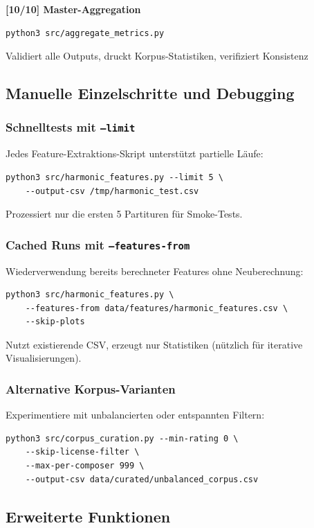 \documentclass[12pt,a4paper]{article}
\theoremstyle{definition}
\begin{document}
\textbf{[10/10] Master-Aggregation}
\begin{lstlisting}
python3 src/aggregate_metrics.py
\end{lstlisting}
Validiert alle Outputs, druckt Korpus-Statistiken, verifiziert Konsistenz

\subsection{Manuelle Einzelschritte und Debugging}

\subsubsection{Schnelltests mit \texttt{--limit}}

Jedes Feature-Extraktions-Skript unterstützt partielle Läufe:
\begin{lstlisting}
python3 src/harmonic_features.py --limit 5 \
    --output-csv /tmp/harmonic_test.csv
\end{lstlisting}
Prozessiert nur die ersten 5 Partituren für Smoke-Tests.

\subsubsection{Cached Runs mit \texttt{--features-from}}

Wiederverwendung bereits berechneter Features ohne Neuberechnung:
\begin{lstlisting}
python3 src/harmonic_features.py \
    --features-from data/features/harmonic_features.csv \
    --skip-plots
\end{lstlisting}
Nutzt existierende CSV, erzeugt nur Statistiken (nützlich für iterative Visualisierungen).

\subsubsection{Alternative Korpus-Varianten}

Experimentiere mit unbalancierten oder entspannten Filtern:
\begin{lstlisting}
python3 src/corpus_curation.py --min-rating 0 \
    --skip-license-filter \
    --max-per-composer 999 \
    --output-csv data/curated/unbalanced_corpus.csv
\end{lstlisting}

\subsection{Erweiterte Funktionen}
\end{document}
